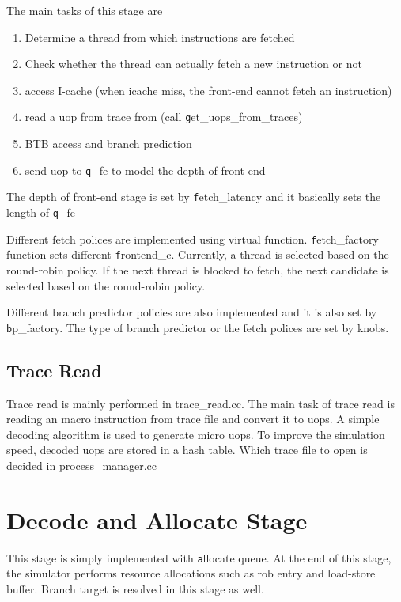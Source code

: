 The main tasks of this stage are 
\begin{enumerate}
\item Determine a thread from which instructions are fetched 
\item Check whether the thread can actually fetch a new instruction or not  
\item access I-cache  (when icache miss, the front-end cannot fetch an instruction) 
\item read a uop from trace from (call {\texttt get\_uops\_from\_traces})
\item BTB access and branch prediction 
\item send uop to {\texttt q\_fe} to model the depth of front-end 
\end{enumerate}
The depth of front-end stage is set by {\texttt fetch\_latency} and it basically sets the length of 
{\texttt q\_fe  }

Different fetch polices are implemented using virtual function. {\texttt fetch\_factory} function sets 
different {\texttt frontend\_c}. Currently, a thread is selected based on the round-robin policy. If the next thread is blocked to fetch, the next candidate is selected based on the round-robin policy. 

 Different branch predictor policies are also implemented and it is also set by {\texttt bp\_factory}. The type of branch predictor or the fetch polices are set by knobs. 



\subsection{Trace Read} 
Trace read is mainly performed in trace\_read.cc. 
The main task of trace read is reading an macro instruction from trace file and convert it to uops. 
A simple decoding algorithm is used to generate micro uops. 
To improve the simulation speed, decoded uops are stored in a hash table. 
Which trace file to open is decided in process\_manager.cc 



\section{Decode and  Allocate Stage }
This stage is simply implemented with {\texttt  allocate queue}.
At the end of this stage,  the simulator performs resource allocations such as rob entry and load-store buffer. 
Branch target is resolved in this stage as well. 

